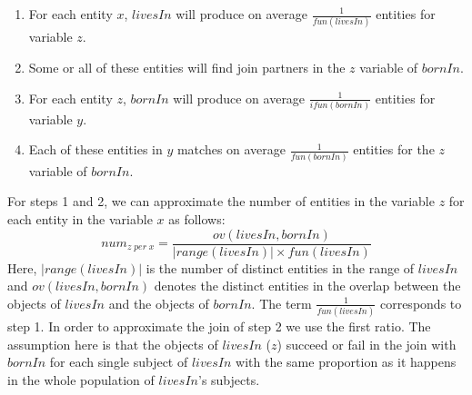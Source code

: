 {\begin{enumerate} \itemsep +0.3ex
 \item For each entity $x$, $livesIn$ will produce on average $\frac{1}{fun(livesIn)}$ entities for variable $z$.
 \item Some or all of these entities will find join partners in the $z$ variable of $bornIn$.
 \item For each entity $z$, $bornIn$ will produce on average $\frac{1}{ifun(bornIn)}$ entities for variable $y$.
  \item Each of these entities in $y$ matches on average $\frac{1}{fun(bornIn)}$ entities for the $z$ variable of $bornIn$.
\end{enumerate}
For steps 1 and 2, we can approximate the number of entities in the variable $z$ for each entity in the variable $x$ as follows:
$$
 num_{z \; per \; x}= \frac{ov(livesIn,bornIn)}{|range(livesIn)| \times fun(livesIn)}
$$
Here, $|range(livesIn)|$ is the number of distinct entities in the range of $livesIn$ and $ov(livesIn,bornIn)$ denotes the distinct entities in the overlap between the objects of $livesIn$ and the objects of $bornIn$. The term $\frac{1}{fun(livesIn)}$ corresponds to step  1. In order to approximate the join of step 2 we use the first ratio. 
The assumption here is that the objects of $livesIn$ ($z$) succeed or fail in the join with $bornIn$ for each single subject of $livesIn$ with the same proportion as it happens in the whole population of $livesIn$'s subjects.

}
